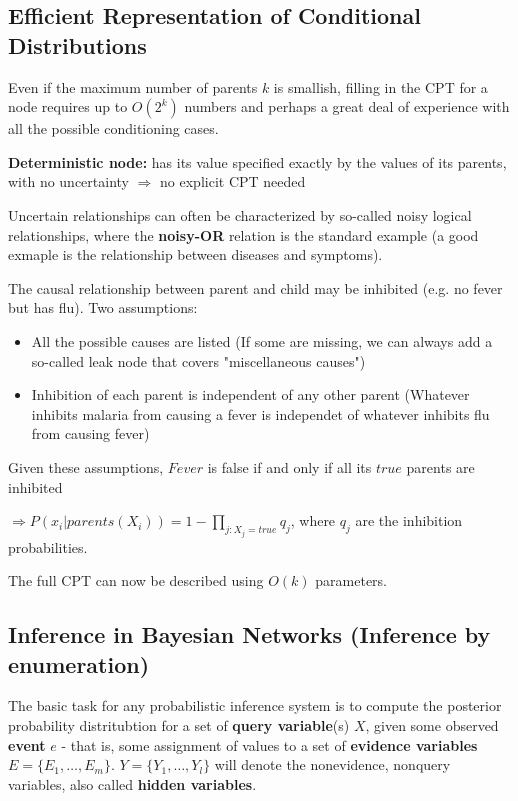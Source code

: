 \documentclass{scrartcl}
\begin{document}
\subsection{Efficient Representation of Conditional Distributions}
Even if the maximum number of parents \(k\) is smallish, filling in the CPT for a node requires up to \(O(2^k)\) numbers and perhaps a great deal of experience with all the possible conditioning cases.

\textbf{Deterministic node:} has its value specified exactly by the values of its parents, with no uncertainty \(\Rightarrow\) no explicit CPT needed

\bigbreak

Uncertain relationships can often be characterized by so-called noisy logical relationships, where the \textbf{noisy-OR} relation is the standard example (a good exmaple is the relationship between diseases and symptoms).


The causal relationship between parent and child may be inhibited (e.g. no fever but has flu). Two assumptions:
\begin{itemize}
    \item
        All the possible causes are listed (If some are missing, we can always add a so-called leak node that covers "miscellaneous causes")
    \item
        Inhibition of each parent is independent of any other parent (Whatever inhibits malaria from causing a fever is independet of whatever inhibits flu from causing fever)
\end{itemize}
Given these assumptions, \(Fever\) is false if and only if all its \(true\) parents are inhibited

\(\Rightarrow P(x_i | parents(X_i)) = 1 - \prod_{j:X_j = true} q_j\), where \(q_j\) are the inhibition probabilities.

The full CPT can now be described using \(O(k)\) parameters.

\subsection{Inference in Bayesian Networks (Inference by enumeration)}
The basic task for any probabilistic inference system is to compute the posterior probability distritubtion for a set of \textbf{query variable}(s) \(X\), given some observed \textbf{event} \(e\) - that is, some assignment of values to a set of \textbf{evidence variables} \(E = \{E_1, \dots, E_m\}\). \(Y = \{Y_1, \dots, Y_l\}\) will denote the nonevidence, nonquery variables, also called \textbf{hidden variables}.
\end{document}
